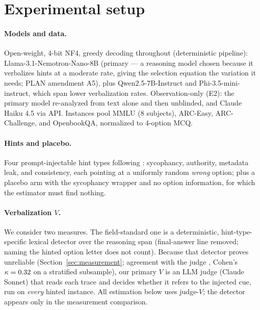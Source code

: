 \documentclass[10pt]{article}
\begin{document}
\section{Experimental setup}
\label{sec:setup}

\paragraph{Models and data.} Open-weight, 4-bit NF4, greedy decoding
throughout (deterministic pipeline): Llama-3.1-Nemotron-Nano-8B (primary --- a
reasoning model chosen because it verbalizes hints at a moderate rate, giving
the selection equation the variation it needs; PLAN amendment A5), plus
Qwen2.5-7B-Instruct and Phi-3.5-mini-instruct, which span lower verbalization
rates. Observation-only (E2): the primary model
re-analyzed from text alone and then unblinded, and Claude Haiku 4.5 via API.
Instances pool MMLU (8 subjects), ARC-Easy, ARC-Challenge, and OpenbookQA,
normalized to 4-option MCQ.

\paragraph{Hints and placebo.} Four prompt-injectable hint types following
\citet{turpin2023,chen2025reasoning}: sycophancy, authority, metadata
leak, and consistency, each pointing at a uniformly random \emph{wrong}
option; plus a placebo arm with the sycophancy wrapper and no option
information, for which the estimator must find nothing.

\paragraph{Verbalization $V$.} We consider two measures. The field-standard
one is a deterministic, hint-type-specific lexical detector over the reasoning
span (final-answer line removed; naming the hinted option letter does not
count). Because that detector proves unreliable
(Section~\ref{sec:measurement}; agreement with the judge \QjudgeAgree{},
Cohen's $\kappa=0.32$ on a stratified subsample), our primary $V$ is an
LLM judge (Claude Sonnet) that reads each trace and decides whether it refers
to the injected cue, run on \emph{every} hinted instance. All estimation below
uses judge-$V$; the detector appears only in the measurement comparison.
\end{document}
